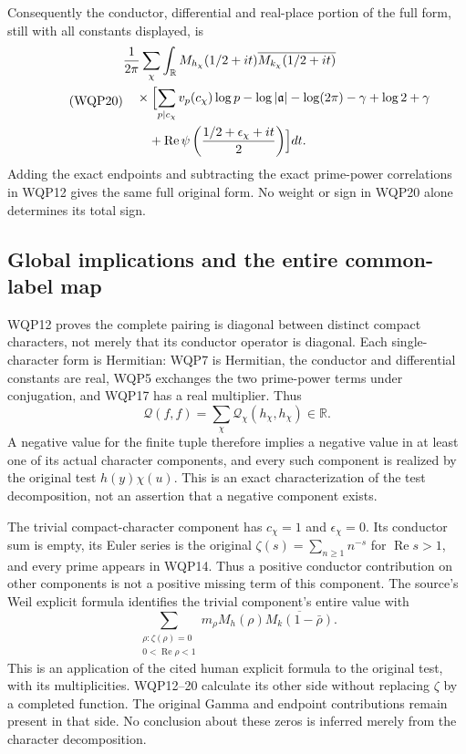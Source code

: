 Consequently the conductor, differential and real-place portion
of the full form, still with all constants displayed, is
\begin{equation}\tag{WQP20}
 \begin{aligned}
 &\frac1{2\pi}\sum_\chi\int_{\mathbb R}
 M_{h_\chi}(1/2+it)\overline{M_{k_\chi}(1/2+it)}
 \\
 &\quad{}\times\Bigl[
 \sum_{p\mid c_\chi}v_p(c_\chi)\log p-\log|\mathfrak a|
 -\log(2\pi)-\gamma+\log2+\gamma
 \\
 &\qquad
 +\operatorname{Re}\psi\left(\frac{1/2+\epsilon_\chi+it}{2}\right)
 \Bigr]dt .
 \end{aligned}
\end{equation}
Adding the exact endpoints and subtracting the exact prime-power
correlations in WQP12 gives the same full original form.
No weight or sign in WQP20 alone determines its total sign.

\subsection{Global implications and the entire common-label map}

WQP12 proves the complete pairing is diagonal between distinct
compact characters, not merely that its conductor operator is
diagonal. Each single-character form is Hermitian: WQP7 is
Hermitian, the conductor and differential constants are real,
WQP5 exchanges the two prime-power terms under conjugation,
and WQP17 has a real multiplier. Thus
\begin{equation}\tag{WQP21}
 \mathcal Q(f,f)=\sum_\chi \mathcal Q_\chi(h_\chi,h_\chi)
               \in\mathbb R .
\end{equation}
A negative value for the finite tuple therefore implies a negative
value in at least one of its actual character components, and every
such component is realized by the original test $h(y)\chi(u)$.
This is an exact characterization of the test decomposition, not
an assertion that a negative component exists.

The trivial compact-character component has $c_\chi=1$ and
$\epsilon_\chi=0$. Its conductor sum is empty, its Euler series
is the original $\zeta(s)=\sum_{n\ge1}n^{-s}$ for
$\operatorname{Re}s>1$, and every prime appears in WQP14.
Thus a positive conductor contribution on other components is
not a positive missing term of this component. The source's
Weil explicit formula identifies the trivial component's entire
value with
\begin{equation}\tag{WQP22}
 \sum_{\substack{\rho:\zeta(\rho)=0\\0<\operatorname{Re}\rho<1}}
       m_\rho M_h(\rho)\overline{M_k(1-\bar\rho)} .
\end{equation}
This is an application of the cited human explicit formula to
the original test, with its multiplicities. WQP12--20 calculate
its other side without replacing $\zeta$ by a completed function.
The original Gamma and endpoint contributions remain present
in that side. No conclusion about these zeros is inferred merely
from the character decomposition.

